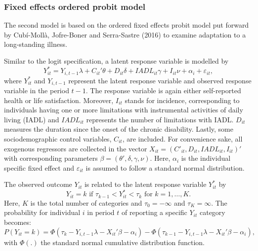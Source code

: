 \documentclass[12pt]{article}
\begin{document}
\subsubsection{Fixed effects ordered probit model}

The second model is based on the ordered fixed effects probit model put forward by Cub\'i-Moll\`a, Jofre-Boner and Serra-Sastre (2016) to examine adaptation to a long-standing illness.

Similar to the logit specification, a latent response variable is modelled by
\begin{equation}
    Y_{it}^{*} = Y_{i,t-1}\lambda + C_{it}'\theta + D_{it}\delta + IADL_{it}\gamma + I_{it}\nu + \alpha_{i} + \varepsilon_{it},
\end{equation}
where $Y_{it}^{*}$ and $Y_{i,t-1}$ represent the latent response variable and observed response variable in the period $t-1$. The response variable is again either self-reported health or life satisfaction. Moreover, $I_{it}$ stands for incidence, corresponding to individuals having one or more limitations with instrumental activities of daily living (IADL) and $IADL_{it}$ represents the number of limitations with IADL. $D_{it}$ measures the duration since the onset of the chronic disability. Lastly, some sociodemographic control variables, $C_{it}$, are included. For convenience sake, all exogenous regressors are collected in the vector $X_{it} = (C'_{it},D_{it},IADL_{it},I_{it})'$ with corresponding parameters $\beta = (\theta',\delta,\gamma,\nu)$. Here, $\alpha_{i}$ is the individual specific fixed effect and $\varepsilon_{it}$ is assumed to follow a standard normal distribution.

The observed outcome $Y_{it}$ is related to the latent response variable $Y_{it}^{*}$ by
\begin{equation} 
    Y_{it} = k \text{ if } \tau_{k-1} < Y_{it}^{*} < \tau_{k} \text{ for } k=1,\ldots,K.  
\end{equation}  
Here, $K$ is the total number of categories and $\tau_{0}=-\infty$ and $\tau_{K}=\infty$. The probability for individual $i$ in period $t$ of reporting a specific $Y_{it}$ category becomes: 
\begin{equation} 
\label{PHI} 
    P(Y_{it}=k) = \Phi(\tau_{k} - Y_{i,t-1}\lambda - X_{it}'\beta - \alpha_{i}) - \Phi(\tau_{k-1} - Y_{i,t-1}\lambda - X_{it}'\beta - \alpha_{i}), 
\end{equation} 
with $\Phi(.)$ the standard normal cumulative distribution function.  
\end{document}
